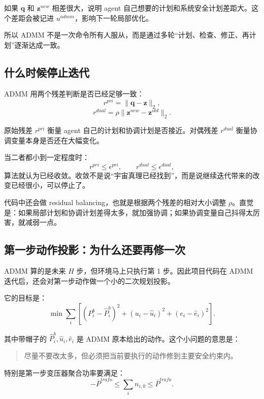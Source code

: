 \documentclass[UTF8,zihao=-4]{ctexart}
\begin{document}
如果 $\bm{q}$ 和 $\bm{z}^{new}$ 相差很大，说明 agent 自己想要的计划和系统安全计划差距大。这个差距会被记进 $u^{admm}$，影响下一轮局部优化。

所以 ADMM 不是一次命令所有人服从，而是通过多轮“计划、检查、修正、再计划”逐渐达成一致。

\subsection{什么时候停止迭代}

ADMM 用两个残差判断是否已经足够一致：
\begin{equation}
r^{pri}
=
\|\bm{q}-\bm{z}\|_2,
\end{equation}
\begin{equation}
r^{dual}
=
\rho\|\bm{z}^{new}-\bm{z}^{old}\|_2.
\end{equation}

原始残差 $r^{pri}$ 衡量 agent 自己的计划和协调计划是否接近。对偶残差 $r^{dual}$ 衡量协调变量本身是否还在大幅变化。

当二者都小到一定程度时：
\begin{equation}
r^{pri}\le \epsilon^{pri},
\qquad
r^{dual}\le \epsilon^{dual},
\end{equation}
算法就认为已经收敛。收敛不是说“宇宙真理已经找到”，而是说继续迭代带来的改变已经很小，可以停止了。

代码中还会做 residual balancing，也就是根据两个残差的相对大小调整 $\rho$。直觉是：如果局部计划和协调计划差得太多，就加强协调；如果协调变量自己抖得太厉害，就减弱一点。

\subsection{第一步动作投影：为什么还要再修一次}

ADMM 算的是未来 $H$ 步，但环境马上只执行第 1 步。因此项目代码在 ADMM 迭代后，还会对第一步动作做一个小的二次规划投影。

它的目标是：
\begin{equation}
\min
\sum_i
\left[
(P^b_i-\hat P^b_i)^2
+(u_i-\hat u_i)^2
+(e_i-\hat e_i)^2
\right].
\end{equation}

其中带帽子的 $\hat P^b_i,\hat u_i,\hat e_i$ 是 ADMM 原本给出的动作。这个小问题的意思是：
\begin{quote}
尽量不要改太多，但必须把当前要执行的动作修到主要安全约束内。
\end{quote}

特别是第一步变压器聚合功率要满足：
\begin{equation}
-\bar P^{trafo}
\le
\sum_i n_{i,0}
\le
\bar P^{trafo}.
\end{equation}
\end{document}
